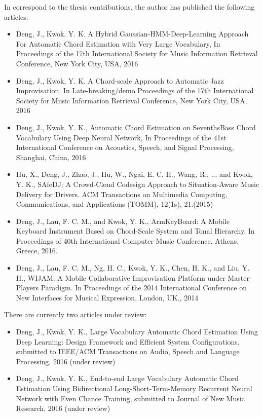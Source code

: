 In correspond to the thesis contributions, the author has published the following articles:
\begin{itemize}
\item Deng, J., Kwok, Y. K. A Hybrid Gaussian-HMM-Deep-Learning Approach For Automatic Chord Estimation with Very Large Vocabulary, In Proceedings of the 17th International Society for Music Information Retrieval Conference, New York City, USA, 2016
\item Deng, J., Kwok, Y. K. A Chord-scale Approach to Automatic Jazz Improvisation, In Late-breaking/demo Proceedings of the 17th International Society for Music Information Retrieval Conference, New York City, USA, 2016
\item Deng, J., Kwok, Y. K., Automatic Chord Estimation on SeventhsBass Chord Vocabulary Using Deep Neural Network, In Proceedings of the 41st International Conference on Acoustics, Speech, and Signal Processing, Shanghai, China, 2016
\item Hu, X., Deng, J., Zhao, J., Hu, W., Ngai, E. C. H., Wang, R., ... and Kwok, Y. K., SAfeDJ: A Crowd-Cloud Codesign Approach to Situation-Aware Music Delivery for Drivers. ACM Transactions on Multimedia Computing, Communications, and Applications (TOMM), 12(1s), 21.(2015)
\item Deng, J., Lau, F. C. M., and Kwok, Y. K., ArmKeyBoard: A Mobile Keyboard Instrument Based on Chord-Scale System and Tonal Hierarchy. In Proceedings of 40th International Computer Music Conference, Athens, Greece, 2016.
\item Deng, J., Lau, F. C. M., Ng, H. C., Kwok, Y. K., Chen, H. K., and Liu, Y. H., WIJAM: A Mobile Collaborative Improvisation Platform under Master-Players Paradigm. In Proceedings of the 2014 International Conference on New Interfaces for Musical Expression, London, UK., 2014
\end{itemize}

There are currently two articles under review:
\begin{itemize}
\item Deng, J., Kwok, Y. K., Large Vocabulary Automatic Chord Estimation Using Deep Learning: Design Framework and Efficient System Configurations, submitted to IEEE/ACM Transactions on Audio, Speech and Language Processing, 2016 (under review)
\item Deng, J., Kwok, Y. K., End-to-end Large Vocabulary Automatic Chord Estimation Using Bidirectional Long-Short-Term-Memory Recurrent Neural Network with Even Chance Training, submitted to Journal of New Music Research, 2016 (under review)
\end{itemize}




